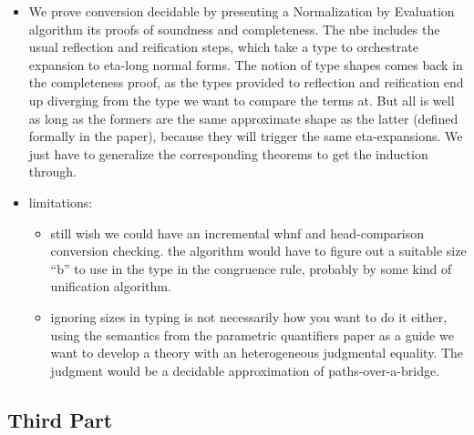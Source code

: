 \documentclass{book}
\begin{document}
\begin{itemize}
\begin{itemize}
   \item We prove conversion decidable by presenting a Normalization by
   Evaluation algorithm its proofs of soundness and completeness.
   The nbe includes the usual reflection and reification steps, which
   take a type to orchestrate expansion to eta-long normal forms.
   The notion of type shapes comes back in the completeness proof, as
   the types provided to reflection and reification end up diverging
   from the type we want to compare the terms at.
   But all is well as long as the formers are the same approximate
   shape as the latter (defined formally in the paper), because they
   will trigger the same eta-expansions.
   We just have to generalize the corresponding theorems to get the
   induction through.

 \item limitations:
     \begin{itemize}
     \item still wish we could have an incremental whnf and
     head-comparison conversion checking. the algorithm would have to
     figure out a suitable size ``b'' to use in the type in the
     congruence rule, probably by some kind of unification algorithm.

     \item ignoring sizes in typing is not necessarily how you want to do
     it either, using the semantics from the parametric quantifiers
     paper as a guide we want to develop a theory with an
     heterogeneous judgmental equality.
     The judgment would be a decidable approximation of
     paths-over-a-bridge.
     \end{itemize}
    \end{itemize}
    \end{itemize}
\subsection{Third Part}
\end{document}
